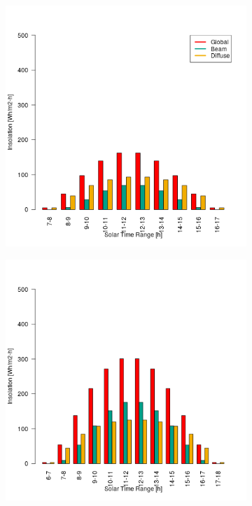 \begin{figure}[H]
\vspace{-2ex}
	\centering
    \setlength{\subfigureWidth}{0.50\textwidth}
    \setlength{\graphicsHeight}{80mm}
    \hypersetup{hidelinks=true}%
  	\begin{subfigure}[t]{\subfigureWidth}
      \centering
  		\includegraphics[height=\graphicsHeight]{sections/martian-environment/plots/diurnal-insolation-variation-1-for-ls-71-phi-40-and-tau-05.png}
  		\label{fig:sub:insolation-phi-m40}
  	\end{subfigure}\hfill
    \begin{subfigure}[t]{\subfigureWidth}
      \centering
  		\includegraphics[height=\graphicsHeight]{sections/martian-environment/plots/diurnal-insolation-variation-2-for-ls-71-phi-20-and-tau-05.png}

\end{subfigure}
\end{figure}
